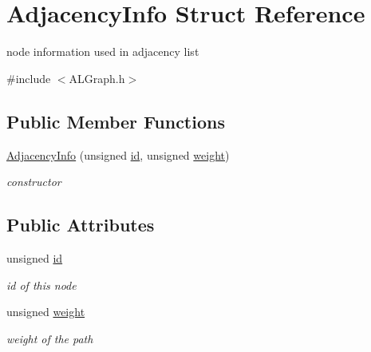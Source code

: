 \hypertarget{structAdjacencyInfo}{\section{Adjacency\-Info Struct Reference}
\label{structAdjacencyInfo}
}


node information used in adjacency list  




{\ttfamily \#include $<$A\-L\-Graph.\-h$>$}

\subsection*{Public Member Functions}
\begin{DoxyCompactItemize}
\item 
\hyperlink{structAdjacencyInfo_a6c7395f7e88e276cfc7eabae9cf41e00}{Adjacency\-Info} (unsigned \hyperlink{structAdjacencyInfo_ac8792ff76cb9afb6d9f257c35e95b7a7}{id}, unsigned \hyperlink{structAdjacencyInfo_acbf1bda4db417de3d14af9a2379cf4df}{weight})
\begin{DoxyCompactList}\small\item\em constructor \end{DoxyCompactList}\end{DoxyCompactItemize}
\subsection*{Public Attributes}
\begin{DoxyCompactItemize}
\item 
\hypertarget{structAdjacencyInfo_ac8792ff76cb9afb6d9f257c35e95b7a7}{unsigned \hyperlink{structAdjacencyInfo_ac8792ff76cb9afb6d9f257c35e95b7a7}{id}}\label{structAdjacencyInfo_ac8792ff76cb9afb6d9f257c35e95b7a7}

\begin{DoxyCompactList}\small\item\em id of this node \end{DoxyCompactList}\item 
\hypertarget{structAdjacencyInfo_acbf1bda4db417de3d14af9a2379cf4df}{unsigned \hyperlink{structAdjacencyInfo_acbf1bda4db417de3d14af9a2379cf4df}{weight}}\label{structAdjacencyInfo_acbf1bda4db417de3d14af9a2379cf4df}

\begin{DoxyCompactList}\small\item\em weight of the path \end{DoxyCompactList}\end{DoxyCompactItemize}


